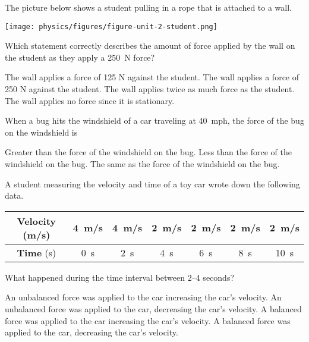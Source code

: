 \documentclass[answers]{exam}
\begin{document}
\begin{questions}
\question 
The picture below shows a student pulling in a rope that is attached to a wall.

\begin{center}
    \texttt{[image: physics/figures/figure-unit-2-student.png]}
\end{center}

Which statement correctly describes the amount of force applied by the wall on the student as they apply a \SI{250}{N} force?
    
\begin{randomizechoices}[norandomize]
    \choice The wall applies a force of 125 N against the student.
    \correctchoice The wall applies a force of 250 N against the student.
    \choice The wall applies twice as much force as the student.
    \choice The wall applies no force since it is stationary.
\end{randomizechoices}

\question 
When a bug hits the windshield of a car traveling at \SI{40}{mph}, the force of the bug on the windshield is

\begin{randomizechoices}[norandomize]
    \choice Greater than the force of the windshield on the bug.
    \choice Less than the force of the windshield on the bug.
    \correctchoice The same as the force of the windshield on the bug.
\end{randomizechoices}

\question
A student measuring the velocity and time of a toy car wrote down the following data.

\begin{center}
    \begin{tabular}{|c|c|c|c|c|c|c|}
        \hline
        \textbf{Velocity} (m/s) & \SI{4}{m/s} &  \SI{4}{m/s} & \SI{2}{m/s} & \SI{2}{m/s} & \SI{2}{m/s} & \SI{2}{m/s} \\ \hline
        \textbf{Time} (s) & \SI{0}{s} & \SI{2}{s} & \SI{4}{s} & \SI{6}{s} & \SI{8}{s} & \SI{10}{s} \\
        \hline
    \end{tabular}
\end{center}

What happened during the time interval between 2--4 seconds?

\begin{randomizechoices}[norandomize]
    \choice An unbalanced force was applied to the car increasing the car’s velocity.
    \correctchoice An unbalanced force was applied to the car, decreasing the car’s velocity.
    \choice A balanced force was applied to the car increasing the car’s velocity.
    \choice A balanced force was applied to the car, decreasing the car’s velocity.   
\end{randomizechoices}


\end{questions}
\end{document}
